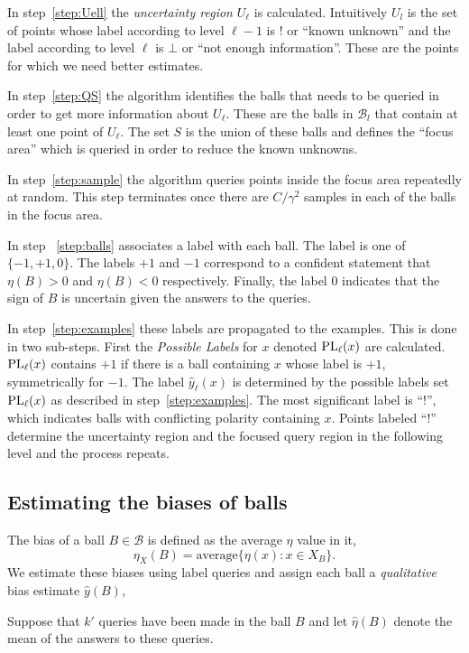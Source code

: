 \documentclass[twoside]{article}
\def\B{{\mathcal B}}
\def\yh{{\widehat{y}}}
\def\PL{{\mbox{\rm PL}}}
\begin{document}
In step~\ref{step:Uell} the {\em uncertainty region} $U_\ell$ is
calculated. Intuitively $U_l$ is the set of points whose label
according to level $\ell-1$ is ! or ``known unknown'' and the label
according to level $\ell$ is $\bot$ or ``not enough information''.
These are the points for which we need better estimates.

In step~\ref{step:QS} the algorithm identifies the balls that needs to
be queried in order to get more information about $U_\ell$. These are
the balls in $\B_l$ that contain at least one point of $U_\ell$.  The
set $S$ is the union of these balls and defines the ``focus area''
which is queried in order to reduce the known unknowns.

In step~\ref{step:sample} the algorithm queries points inside the
focus area repeatedly at random.  This step terminates once there are
$C/\gamma^2$ samples in each of the balls in the focus area.

In step ~\ref{step:balls} associates a label with each ball. The
label is one of $\{-1,+1,0\}$.  The labels $+1$ and $-1$ correspond to
a confident statement that $\eta(B)>0$ and $\eta(B)<0$
respectively. Finally, the label $0$ indicates that the sign of $B$
is uncertain given the answers to the queries.

In step~\ref{step:examples} these labels are propagated to the
examples.  This is done in two sub-steps. First the {\em Possible
  Labels} for $x$ denoted $\PL_\ell(x)$ are calculated. $\PL_\ell(x)$
contains $+1$ if there is a ball containing $x$ whose label is $+1$,
symmetrically for $-1$. The label $\yh_\ell(x)$ is determined by the
possible labels set $\PL_\ell(x)$ as described in
step~\ref{step:examples}. The most significant label is ``!'', which
indicates balls with conflicting polarity containing $x$. Points
labeled ``!'' determine the uncertainty region and the focused query
region in the following level and the process repeats.


\iffalse
\subsection{Estimating the biases of balls}

The bias of a ball $B \in \B$ is defined as the average $\eta$ value in it,
$$ \eta_X(B) = \mbox{average}\{\eta(x): x \in X_B \} .$$
We estimate these biases using label queries and assign each ball a
\emph{qualitative} bias estimate $\yh(B)$,

Suppose that $k'$ queries have been made in the ball $B$ and let
$\widehat{\eta}(B)$ denote the mean of the answers to these queries.
\end{document}
